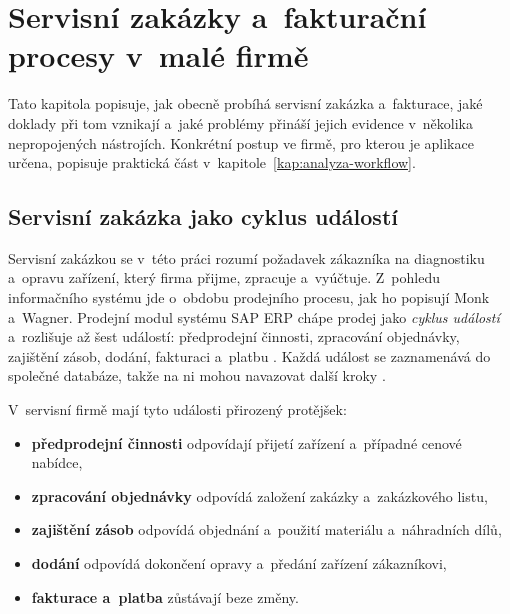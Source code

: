 \chapter{Servisní zakázky a~fakturační procesy v~malé firmě}\label{kap:zakazky-fakturace}

Tato kapitola popisuje, jak obecně probíhá servisní zakázka a~fakturace, jaké doklady při tom vznikají a~jaké problémy přináší jejich evidence v~několika nepropojených nástrojích. Konkrétní postup ve firmě, pro kterou je aplikace určena, popisuje praktická část v~kapitole~\ref{kap:analyza-workflow}.

\section{Servisní zakázka jako cyklus událostí}\label{sec:zakazka-cyklus}

Servisní zakázkou se v~této práci rozumí požadavek zákazníka na diagnostiku a~opravu zařízení, který firma přijme, zpracuje a~vyúčtuje. Z~pohledu informačního systému jde o~obdobu prodejního procesu, jak ho popisují Monk a~Wagner. Prodejní modul systému SAP ERP chápe prodej jako \emph{cyklus událostí} a~rozlišuje až šest událostí: předprodejní činnosti, zpracování objednávky, zajištění zásob, dodání, fakturaci a~platbu \cite[s.~56]{MonkWagner2013}. Každá událost se zaznamenává do společné databáze, takže na ni mohou navazovat další kroky \cite[s.~56]{MonkWagner2013}.

V~servisní firmě mají tyto události přirozený protějšek:
\begin{itemize}
\item \textbf{předprodejní činnosti} odpovídají přijetí zařízení a~případné cenové nabídce,
\item \textbf{zpracování objednávky} odpovídá založení zakázky a~zakázkového listu,
\item \textbf{zajištění zásob} odpovídá objednání a~použití materiálu a~náhradních dílů,
\item \textbf{dodání} odpovídá dokončení opravy a~předání zařízení zákazníkovi,
\item \textbf{fakturace a~platba} zůstávají beze změny.
\end{itemize}


